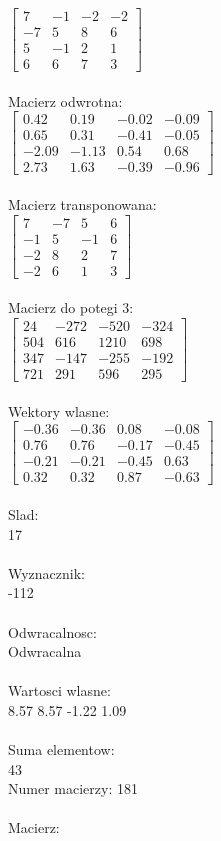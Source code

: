 \documentclass[a4paper,12pt]{article}
\begin{document}
$\begin{bmatrix} 7&-1&-2&-2\\-7&5&8&6\\5&-1&2&1\\6&6&7&3 \end{bmatrix}$
\\
\\
Macierz odwrotna:\\

$\begin{bmatrix} 0.42&0.19&-0.02&-0.09\\0.65&0.31&-0.41&-0.05\\-2.09&-1.13&0.54&0.68\\2.73&1.63&-0.39&-0.96 \end{bmatrix}$
\\
\\
Macierz transponowana:\\

$\begin{bmatrix} 7&-7&5&6\\-1&5&-1&6\\-2&8&2&7\\-2&6&1&3 \end{bmatrix}$
\\
\\
Macierz do potegi 3:\\

$\begin{bmatrix} 24&-272&-520&-324\\504&616&1210&698\\347&-147&-255&-192\\721&291&596&295 \end{bmatrix}$
\\
\\
Wektory wlasne:\\

$\begin{bmatrix} -0.36&-0.36&0.08&-0.08\\0.76&0.76&-0.17&-0.45\\-0.21&-0.21&-0.45&0.63\\0.32&0.32&0.87&-0.63 \end{bmatrix}$
\\
\\
Slad:\\
17
\\
\\
Wyznacznik:\\
-112
\\
\\
Odwracalnosc:\\
Odwracalna
\\
\\
Wartosci wlasne:\\
8.57 8.57 -1.22 1.09
\\
\\
Suma elementow:\\
43
\\
\newpage
Numer macierzy:
181
\\
\\
Macierz:\\
\end{document}

